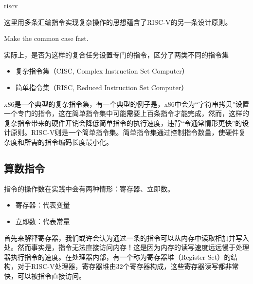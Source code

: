 \begin{Code}[汇编语言中的复杂计算]{riscv}
    
\end{Code}

这里用多条汇编指令实现复杂操作的思想蕴含了RISC-V的另一条设计原则。
\begin{BoxDesignPrinciple}[令通常情形更快]
    \centering
    Make the common case fast.
\end{BoxDesignPrinciple}

实际上，是否为这样的复合任务设置专门的指令，区分了两类不同的指令集
\begin{itemize}
    \item 复杂指令集（CISC, Complex Instruction Set Computer）
    \item 简单指令集（RISC, Reduced Instruction Set Computer）
\end{itemize}
x86是一个典型的复杂指令集，有一个典型的例子是，x86中会为“字符串拷贝”设置一个专门的指令，这在简单指令集中可能需要上百条指令才能完成，然而，这样的复杂指令带来的硬件开销会降低简单指令的执行速度，违背“令通常情形更快”的设计原则。RISC-V则是一个简单指令集。简单指令集通过控制指令数量，使硬件复杂度和所需的指令编码长度最小化。

\subsection{算数指令}

指令的操作数在实践中会有两种情形：寄存器、立即数。
\begin{itemize}
    \item 寄存器：代表变量
    \item 立即数：代表常量
\end{itemize}

首先来解释寄存器，我们或许会认为通过一条的指令可以从内存中读取相加并写入处。然而事实是，指令无法直接访问内存！这是因为内存的读写速度远远慢于处理器执行指令的速度。在处理器内部，有一个称为寄存器堆（Register Set）的结构，对于RISC-V处理器，寄存器堆由32个寄存器构成，这些寄存器读写都非常快，可以被指令直接访问。

